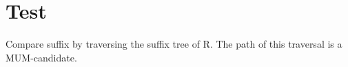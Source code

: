 \documentclass{beamer}
\begin{document}
\section{Test}
\begin{frame}[fragile]
\begin{algorithm}[H]
  \begin{algorithmic}[1]
     \STATE Compare suffix by traversing the suffix tree of R.
     \STATE The path of this traversal is a MUM-candidate.
     \ENDIF
     \ENDFOR
\end{algorithmic}
\label{alg:seq}
\end{algorithm}
\end{frame}
\end{document}
